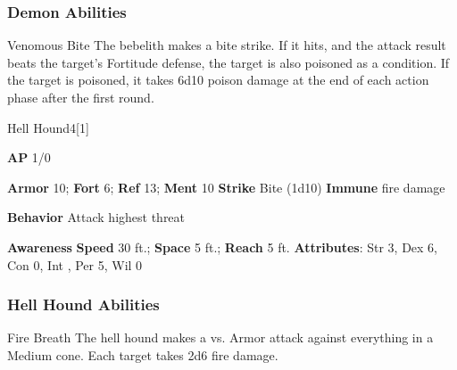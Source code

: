 \subsubsection{Demon Abilities}

\begin{freeability}{Venomous Bite}
The bebelith makes a bite strike.
If it hits, and the attack result beats the target's Fortitude defense, the target is also poisoned as a condition.
If the target is poisoned, it takes 6d10 poison damage at the end of each action phase after the first round.
\end{freeability}

\begin{monsection}{Hell Hound}{4}[1]
\vspace{-1em}\vspace{-1em}
\begin{spellcontent}
\begin{spelltargetinginfo}
{\textbf{AP} 1/0}

\pari \textbf{Armor} 10;
\textbf{Fort} 6;
\textbf{Ref} 13;
\textbf{Ment} 10
\pari \textbf{Strike} Bite  (1d10)
\pari \textbf{Immune} fire damage


\pari \textbf{Behavior} Attack highest threat
\end{spelltargetinginfo}
\end{spellcontent}

\begin{monsterfooter}
\pari \textbf{Awareness} 
\pari \textbf{Speed} 30 ft.;
\textbf{Space} 5 ft.;
\textbf{Reach} 5 ft.
\pari \textbf{Attributes}:
Str 3,
Dex 6,
Con 0,
Int ,
Per 5,
Wil 0
\end{monsterfooter}
\end{monsection}


\subsubsection{Hell Hound Abilities}

\begin{freeability}{Fire Breath}
The hell hound makes a  vs. Armor attack against everything in a Medium cone.
\hit Each target takes 2d6 fire damage.
\end{freeability}

